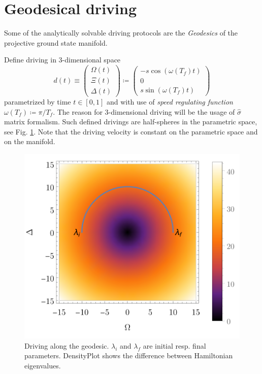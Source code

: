 \section{Geodesical driving}
Some of the analytically solvable driving protocols are the \emph{Geodesics} of the projective ground state manifold. 

Define driving in 3-dimensional space
\begin{equation}
    d(t)\equiv \begin{pmatrix}
        \Omega(t)\\
        \Xi(t)\\
        \Delta(t)
    \end{pmatrix}\coloneqq \begin{pmatrix}
        -s \cos(\omega(T_f)t)\\
        0\\
        s \sin(\omega(T_f)t)
    \end{pmatrix}
\end{equation}
parametrized by time $t\in[0,1]$ and with use of \emph{speed regulating function} $\omega(T_f)\coloneqq \pi/T_f$. The reason for 3-dimensional driving will be the usage of $\hat\sigma$ matrix formalism. Such defined drivings are half-spheres in the parametric space, see Fig. \ref{fig:driving}. Note that the driving velocity is constant on the parametric space and on the manifold.

\begin{figure}[H]
    \centering
    \includegraphics[scale=1.2]{../img/driving.pdf}
    \caption{Driving along the geodesic. $\lambda_i$ and $\lambda_f$ are initial resp. final parameters. DensityPlot shows the difference between Hamiltonian eigenvalues.}
    \label{fig:driving}
\end{figure}


